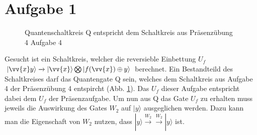 \documentclass[a4paper]{scrartcl}
\begin{document}
\section*{Aufgabe 1}
\begin{figure}[htp] 
\caption{Quantenschaltkreis Q entspricht dem Schaltkreis aus Präsenzübung 4 Aufgabe 4}
\label{p4a4}
\end{figure}
Gesucht ist ein Schaltkreis, welcher die reversieble Einbettung $U_f$ $|\vv{x}y\rangle \xrightarrow{} |\vv{x}\rangle \bigotimes |f(\vv{x}) \oplus y \rangle$ berechnet.
Ein Bestandteild des Schaltkreises darf das Quantengate Q sein, welches dem Schaltkreis aus Aufgabe 4 der Präsenzübung 4 entspircht (Abb. \ref{p4a4}).
Das $U_f$ dieser Aufgabe entspricht dabei dem $U_f$ der Präsenzaufgabe.
Um nun aus Q das Gate $U_f$ zu erhalten muss jeweils die Auswirkung des Gates $W_2$ auf $|y\rangle$ ausgeglichen werden. Dazu kann man die Eigenschaft von $W_2$ nutzen, dass $|y\rangle \xrightarrow{W_2} \xrightarrow{W_2} |y\rangle$ ist.
\end{document}
